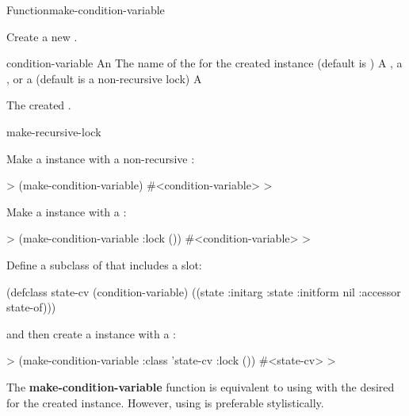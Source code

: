 \documentclass[10pt,twoside,english,pdftex]{article}
\begin{document}
\begin{functiondoc}{Function}{make-condition-variable}%
  {
    }
%
%
%
 
\fnsyntax

\fnpurpose Create a new .

\fnpackage {}

\fnmodule {}

\fnargs
\begin{args}{condition-variable}
\arg[initargs] An 
\arg[class] The name of the  for the created
 instance (default is
)
\arg[lock] A , a , or a 
 (default is a non-recursive lock)
 A 
\end{args}

\fnreturns
The created .

\begin{alsos}{make-recursive-lock}
\end{alsos}

\fnexamples
Make a  instance with a non-recursive 
:
%
\W\supp
\begin{example}
  > (make-condition-variable)
  #<condition-variable>
  >
\end{example}
%
Make a  instance with a
:
%
\W\supp\notpretop
\begin{example}
  > (make-condition-variable :lock ())
  #<condition-variable>
  >
\end{example}
%
Define a subclass of  that includes a 
 slot:
%
\W\supp\notpretop
\begin{example}
  (defclass state-cv (condition-variable)
    ((state :initarg :state
            :initform nil
            :accessor state-of)))
\end{example}
%
and then create a  instance with a
:
%
\W\supp\notpretop
\begin{example}
  > (make-condition-variable :class 'state-cv
                             :lock ())
  #<state-cv>
  >
\end{example}

\fnnote The \textbf{make-condition-variable} function is equivalent to using
 with the desired  for
the created  instance.  However, using
 is preferable stylistically.

\end{functiondoc}
\end{document}
